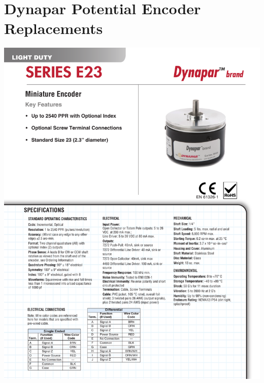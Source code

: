 \section{Dynapar Potential Encoder Replacements}
\begin{center}
	\includegraphics[width=6.5in,angle=0]{afiles/E23_DS_701949_2.pdf}
\end{center}
